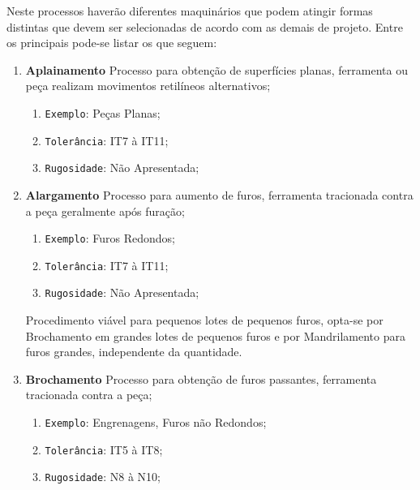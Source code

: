 \documentclass{article}
\begin{document}
            Neste processos haverão diferentes maquinários que podem atingir formas distintas que devem ser selecionadas de acordo com as demais de projeto. Entre os principais pode-se listar os que seguem:
                \begin{enumerate}[rightmargin = \leftmargin]
                    \item \textbf{Aplainamento} Processo para obtenção de superfícies planas, ferramenta ou peça realizam movimentos retilíneos alternativos;
                        \begin{enumerate}[rightmargin = \leftmargin, noitemsep]
                            \item \texttt{Exemplo}: Peças Planas;
                            \item \texttt{Tolerância}: IT7 à IT11;
                            \item \texttt{Rugosidade}: Não Apresentada;
                        \end{enumerate}

                    \item \textbf{Alargamento} Processo para aumento de furos, ferramenta tracionada contra a peça geralmente após furação;
                        \begin{enumerate}[rightmargin = \leftmargin, noitemsep]
                            \item \texttt{Exemplo}: Furos Redondos;
                            \item \texttt{Tolerância}: IT7 à IT11;
                            \item \texttt{Rugosidade}: Não Apresentada;
                        \end{enumerate}
                Procedimento viável para pequenos lotes de pequenos furos, opta-se por Brochamento em grandes lotes de pequenos furos e por Mandrilamento para furos grandes, independente da quantidade.

                    \item \textbf{Brochamento} Processo para obtenção de furos passantes, ferramenta tracionada contra a peça;
                        \begin{enumerate}[rightmargin = \leftmargin, noitemsep]
                            \item \texttt{Exemplo}: Engrenagens, Furos não Redondos;
                            \item \texttt{Tolerância}: IT5 à IT8;
                            \item \texttt{Rugosidade}: N8 à N10;
                        \end{enumerate}


\end{enumerate}
\end{document}
